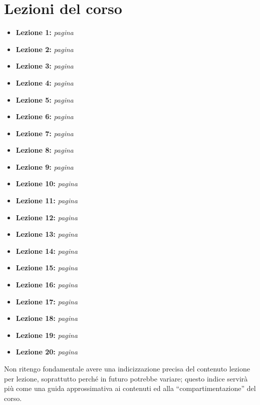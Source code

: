 \documentclass[a4paper,twoside]{book}
\begin{document}
	
	
	\newpage
	\section*{Lezioni del corso}
	\renewcommand{\labelitemi}{$\blacksquare$}
	\begin{itemize}
		\item {\large \textbf{Lezione 1:} \textit{pagina \pageref{lezione1}}}
		\item {\large \textbf{Lezione 2:} \textit{pagina \pageref{lezione2}}}
		\item {\large \textbf{Lezione 3:} \textit{pagina \pageref{lezione3}}}
		\item {\large \textbf{Lezione 4:} \textit{pagina \pageref{lezione4}}}
		\item {\large \textbf{Lezione 5:} \textit{pagina \pageref{lezione5}}}
		\item {\large \textbf{Lezione 6:} \textit{pagina \pageref{lezione6}}}
		\item {\large \textbf{Lezione 7:} \textit{pagina \pageref{lezione7}}}
		\item {\large \textbf{Lezione 8:} \textit{pagina \pageref{lezione8}}}
		\item {\large \textbf{Lezione 9:} \textit{pagina \pageref{lezione9}}}
		\item {\large \textbf{Lezione 10:} \textit{pagina \pageref{lezione10}}}
		\item {\large \textbf{Lezione 11:} \textit{pagina \pageref{lezione11}}}
		\item {\large \textbf{Lezione 12:} \textit{pagina \pageref{lezione12}}}
		\item {\large \textbf{Lezione 13:} \textit{pagina \pageref{lezione13}}}
		\item {\large \textbf{Lezione 14:} \textit{pagina \pageref{lezione14}}}
		\item {\large \textbf{Lezione 15:} \textit{pagina \pageref{lezione15}}}
		\item {\large \textbf{Lezione 16:} \textit{pagina \pageref{lezione16}}}
		\item {\large \textbf{Lezione 17:} \textit{pagina \pageref{lezione17}}}
		\item {\large \textbf{Lezione 18:} \textit{pagina \pageref{lezione18}}}
		\item {\large \textbf{Lezione 19:} \textit{pagina \pageref{lezione19}}}
		\item {\large \textbf{Lezione 20:} \textit{pagina \pageref{lezione20}}}
	\end{itemize}
	\renewcommand{\labelitemi}{$\bullet$}
	Non ritengo fondamentale avere una indicizzazione precisa del contenuto lezione per lezione, soprattutto perché in futuro potrebbe variare; questo indice servirà più come una guida approssimativa ai contenuti ed alla \enquote{compartimentazione} del corso.
	
\end{document}
